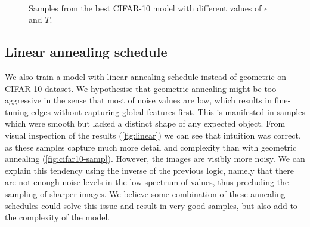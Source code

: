 \begin{figure}[h!]
    \centering
    \hspace{1mm}
    \hspace{1mm}
    \\
    \hspace{1mm}
     \caption{Samples from the best CIFAR-10 model with different values of $\epsilon$ and $T$.}
     \label{fig:varying-epsilon}
\end{figure}
 
\subsection{Linear annealing schedule}
We also train a model with linear annealing schedule instead of geometric on CIFAR‐10 dataset. We hypothesise that geometric annealing might be too aggressive in the sense that most of noise values are low, which results in fine‐tuning edges without capturing global features first. This is manifested in samples which were smooth but lacked a distinct shape of any expected object. From visual inspection of the results (\autoref{fig:linear}) we can see that intuition was correct, as these samples capture much more detail and complexity than with geometric annealing (\autoref{fig:cifar10-samp}). However, the images are visibly more noisy. We can explain this tendency using the inverse of the previous logic, namely that there are not enough noise levels in the low spectrum of values, thus precluding the sampling of sharper images. We believe some combination of these annealing schedules could solve this issue and result in very good samples, but also add to the complexity of the model.

